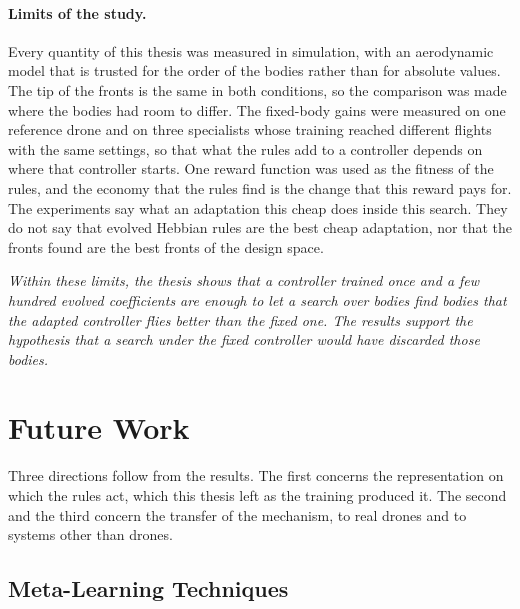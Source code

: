 \paragraph{Limits of the study.} Every quantity of this thesis was measured in simulation, with an aerodynamic model that is trusted for the order of the bodies rather than for absolute values. The tip of the fronts is the same in both conditions, so the comparison was made where the bodies had room to differ. The fixed-body gains were measured on one reference drone and on three specialists whose training reached different flights with the same settings, so that what the rules add to a controller depends on where that controller starts. One reward function was used as the fitness of the rules, and the economy that the rules find is the change that this reward pays for. The experiments say what an adaptation this cheap does inside this search. They do not say that evolved Hebbian rules are the best cheap adaptation, nor that the fronts found are the best fronts of the design space.

\emph{Within these limits, the thesis shows that a controller trained once and a few hundred evolved coefficients are enough to let a search over bodies find bodies that the adapted controller flies better than the fixed one. The results support the hypothesis that a search under the fixed controller would have discarded those bodies.}

\section{Future Work}
\label{sec:future-work}

Three directions follow from the results. The first concerns the representation on which the rules act, which this thesis left as the training produced it. The second and the third concern the transfer of the mechanism, to real drones and to systems other than drones.

\subsection{Meta-Learning Techniques}
\label{subsec:future-meta-learning}

